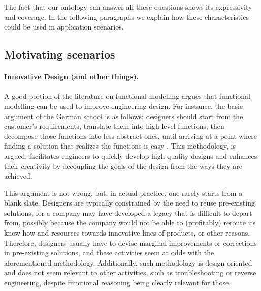 \documentclass[sw]{iosart2x}
\begin{document}
\medskip
The fact that our ontology can answer all these questions shows its expressivity and coverage.
In the following paragraphs we explain how these characteristics could be used in application scenarios.


\subsection{Motivating scenarios}
\paragraph{Innovative Design (and other things).}
A good portion of the literature on functional modelling argues that functional modelling can be used to improve engineering design.
For instance, the basic argument of the German school is as follows: designers should start from the customer's requirements, translate them into high-level functions, then decompose those functions into less abstract ones, until arriving at a point where finding a solution that realizes the functions is easy \cite{pahl_engineering_2007}.
This methodology, is argued, facilitates engineers to quickly develop high-quality designs and enhances their creativity by decoupling the goals of the design from the ways they are achieved.

This argument is not wrong, but, in actual practice, one rarely starts from a blank slate. 
Designers are typically constrained by the need to reuse pre-existing solutions, for a company may have developed a legacy that is difficult to depart from, possibly because the company would not be able to (profitably) reroute its know-how and resources towards innovative lines of products, or other reasons.
Therefore, designers usually have to devise marginal improvements or corrections in pre-existing solutions, and these activities seem at odds with the aforementioned methodology. %
Additionally, such methodology is design-oriented and does not seem relevant to other activities, such as troubleshooting or reverse engineering, despite functional reasoning being clearly relevant for those.
\end{document}
